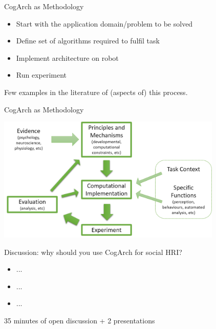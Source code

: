 \documentclass[compress]{beamer}
\begin{document}
\begin{frame}{CogArch as Methodology}    

    \begin{itemize}
        \item Start with the application domain/problem to be solved
        \item Define set of algorithms required to fulfil task
        \item Implement architecture on robot
        \item Run experiment
    \end{itemize}
    
    Few examples in the literature of (aspects of) this process.

\end{frame}

\begin{frame}{CogArch as Methodology}    

    \includegraphics[height=60mm]{cogarch-methodology}

\end{frame}




\begin{frame}{Discussion: why should you use CogArch for social HRI?}
    

    \begin{itemize}
        \item ...
        \item ...
        \item ...
    \end{itemize}

    35 minutes of open discussion + 2 presentations

\end{frame}
\end{document}
